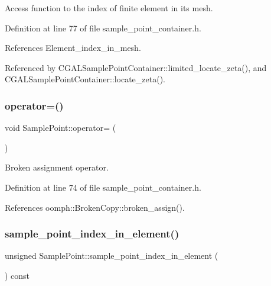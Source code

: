 Access function to the index of finite element in its mesh. 



Definition at line 77 of file sample\+\_\+point\+\_\+container.\+h.



References Element\+\_\+index\+\_\+in\+\_\+mesh.



Referenced by C\+G\+A\+L\+Sample\+Point\+Container\+::limited\+\_\+locate\+\_\+zeta(), and C\+G\+A\+L\+Sample\+Point\+Container\+::locate\+\_\+zeta().

\mbox{\label{classSamplePoint_aa91f365695d1f4567723770d880e60b2}} 
\subsubsection{\texorpdfstring{operator=()}{operator=()}}
{\footnotesize\ttfamily void Sample\+Point\+::operator= (\begin{DoxyParamCaption}\item[{const \hyperlink{classSamplePoint}{Sample\+Point} \&}]{ }\end{DoxyParamCaption})\hspace{0.3cm}{\ttfamily [inline]}}



Broken assignment operator. 



Definition at line 74 of file sample\+\_\+point\+\_\+container.\+h.



References oomph\+::\+Broken\+Copy\+::broken\+\_\+assign().

\mbox{\label{classSamplePoint_ad0d3ebd068a502dcd4d2940449560fb0}} 
\subsubsection{\texorpdfstring{sample\+\_\+point\+\_\+index\+\_\+in\+\_\+element()}{sample\_point\_index\_in\_element()}}
{\footnotesize\ttfamily unsigned Sample\+Point\+::sample\+\_\+point\+\_\+index\+\_\+in\+\_\+element (\begin{DoxyParamCaption}{ }\end{DoxyParamCaption}) const\hspace{0.3cm}{\ttfamily [inline]}}



